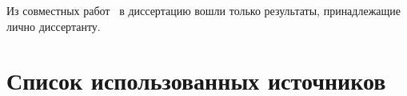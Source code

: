 \documentclass[12pt,a4paper,openbib]{report}
\def\selfcite{\parencite}
\theoremstyle{definition}
\begin{document}
\begin{siderules}
	Из совместных работ~\selfcite{our-mz2019measure,avdeed2021AandA,avdeev2024decomposition,avdeev2024set_DAN_rus,our-vzms-2018}
	в диссертацию вошли только результаты, принадлежащие лично диссертанту.
\end{siderules}


\section*{Список использованных источников}

\printbibliography[keyword=avdeev,notcategory=HSEpapers,heading=none,title={~}]{}
\printbibliography[notkeyword=avdeev,heading=none,title={~}]{}


%
\end{document}
